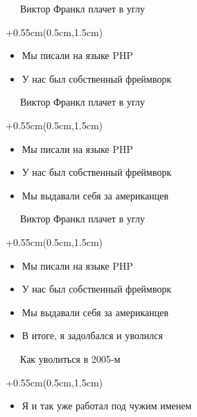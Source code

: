 \documentclass[xetex,18pt,aspectratio=169]{beamer}
\begin{document}
\begin{Large}
\begin{frame}{\ \ \ Виктор Франкл плачет в углу}
\begin{textblock*}{\framewidth+0.55cm}(0.5cm,1.5cm)
\begin{itemize}
  \item Мы писали на языке PHP
  \item У нас был собственный фреймворк
\end{itemize}
\end{textblock*}
\end{frame}

\begin{frame}{\ \ \ Виктор Франкл плачет в углу}
\begin{textblock*}{\framewidth+0.55cm}(0.5cm,1.5cm)
\begin{itemize}
  \item Мы писали на языке PHP
  \item У нас был собственный фреймворк
  \item Мы выдавали себя за американцев
\end{itemize}
\end{textblock*}
\end{frame}

\begin{frame}{\ \ \ Виктор Франкл плачет в углу}
\begin{textblock*}{\framewidth+0.55cm}(0.5cm,1.5cm)
\begin{itemize}
  \item Мы писали на языке PHP
  \item У нас был собственный фреймворк
  \item Мы выдавали себя за американцев
  \item В итоге, я задолбался и уволился
\end{itemize}
\end{textblock*}
\end{frame}

\begin{frame}{\ \ \ Как уволиться в 2005-м}
\begin{textblock*}{\framewidth+0.55cm}(0.5cm,1.5cm)
\begin{itemize}
  \item Я и так уже работал под чужим именем
\end{itemize}
\end{textblock*}
\end{frame}


\end{Large}
\end{document}
